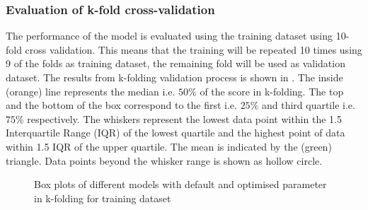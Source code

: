 \subsubsection*{Evaluation of k-fold cross-validation}

The performance of the model is evaluated using the training dataset using 10-fold cross validation. This means that the training will be repeated 10 times using 9 of the folds as training dataset, the remaining fold will be used as validation dataset. The results from k-folding validation process is shown in . The inside (orange) line represents the median i.e. $50\%$ of the score in k-folding. The top and the bottom of the box correspond to the first i.e. $25\%$ and third quartile i.e. $75\%$ respectively. The whiskers represent the lowest data point within the 1.5 Interquartile Range (IQR) of the lowest quartile and the highest point of data within 1.5 IQR of the upper quartile. The mean is indicated by the (green) triangle. Data points beyond the whisker range is shown as hollow circle.\\

\begin{figure}[ht]
    \centering
    \caption{Box plots of different models with default and optimised parameter in k-folding for training dataset}
    \label{fig:train_boxplot_r2_rmse}
\end{figure}

